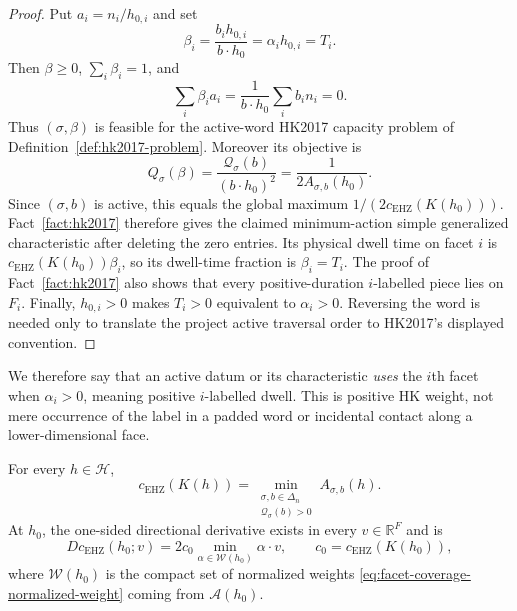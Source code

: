 \begin{unverified}
\begin{proof}
Put $a_i=n_i/h_{0,i}$ and set
\[
  \beta_i=\frac{b_i h_{0,i}}{b\cdot h_0}
          =\alpha_i h_{0,i}=T_i.
\]
Then $\beta\geq0$, $\sum_i\beta_i=1$, and
\[
  \sum_i\beta_i a_i
  =\frac{1}{b\cdot h_0}\sum_i b_i n_i=0.
\]
Thus $(\sigma,\beta)$ is feasible for the active-word HK2017 capacity
problem of Definition~\ref{def:hk2017-problem}.  Moreover its objective is
\[
  Q_\sigma(\beta)
  =\frac{\mathcal Q_\sigma(b)}{(b\cdot h_0)^2}
  =\frac{1}{2A_{\sigma,b}(h_0)}.
\]
Since $(\sigma,b)$ is active, this equals the global maximum
$1/(2c_{\mathrm{EHZ}}(K(h_0)))$.  Fact~\ref{fact:hk2017} therefore gives the
claimed minimum-action simple generalized characteristic after deleting the
zero entries.  Its physical dwell time on facet $i$ is
$c_{\mathrm{EHZ}}(K(h_0))\beta_i$, so its dwell-time fraction is
$\beta_i=T_i$.  The proof of Fact~\ref{fact:hk2017} also shows that every
positive-duration $i$-labelled piece lies on $F_i$.  Finally,
$h_{0,i}>0$ makes $T_i>0$ equivalent to $\alpha_i>0$.  Reversing the word is
needed only to translate the project active traversal order to HK2017's
displayed convention.
\end{proof}

We therefore say that an active datum or its characteristic \emph{uses} the
$i$th facet when $\alpha_i>0$, meaning positive $i$-labelled dwell.  This is
positive HK weight, not mere occurrence of the label in a padded word or
incidental contact along a lower-dimensional face.

\begin{lemma}
\label{lem:facet-coverage-support-envelope}
For every $h\in\mathcal H$,
\begin{equation}\label{eq:facet-coverage-capacity-envelope}
  c_{\mathrm{EHZ}}(K(h))
  =\min_{\substack{\sigma, b\in\Delta_n\\\mathcal Q_\sigma(b)>0}}
       A_{\sigma,b}(h).
\end{equation}
At $h_0$, the one-sided directional derivative exists in every
$v\in\mathbb R^F$ and is
\begin{equation}\label{eq:facet-coverage-capacity-derivative}
  Dc_{\mathrm{EHZ}}(h_0;v)
  =2c_0\min_{\alpha\in\mathcal W(h_0)}\alpha\cdot v,
  \qquad c_0=c_{\mathrm{EHZ}}(K(h_0)),
\end{equation}
where $\mathcal W(h_0)$ is the compact set of normalized weights
\eqref{eq:facet-coverage-normalized-weight} coming from
$\mathcal A(h_0)$.
\end{lemma}


\end{unverified}

